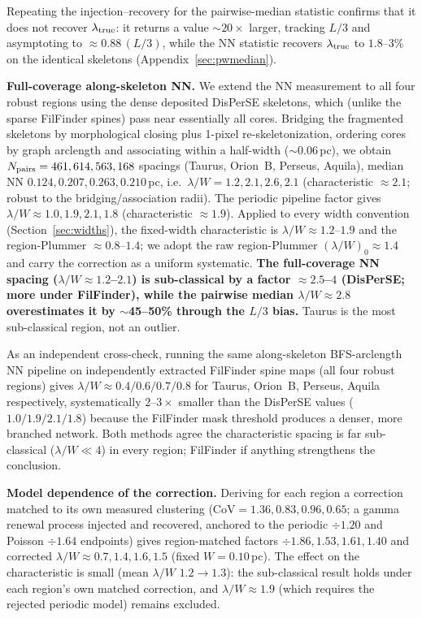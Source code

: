 \documentclass[usenatbib,twoside,twocolumn]{mnras}
\begin{document}
Repeating the injection--recovery for the pairwise-median statistic confirms that it does not recover $\lambda_{\rm true}$: it returns a value $\sim$$20\times$ larger, tracking $L/3$ and asymptoting to $\approx0.88\,(L/3)$, while the NN statistic recovers $\lambda_{\rm true}$ to $1.8$--$3\%$ on the identical skeletons (Appendix~\ref{sec:pwmedian}).

\textbf{Full-coverage along-skeleton NN.} We extend the NN measurement to all four robust regions using the dense deposited DisPerSE skeletons, which (unlike the sparse FilFinder spines) pass near essentially all cores. Bridging the fragmented skeletons by morphological closing plus 1-pixel re-skeletonization, ordering cores by graph arclength and associating within a half-width ($\sim$0.06\,pc), we obtain $N_{\rm pairs}=461,614,563,168$ spacings (Taurus, Orion~B, Perseus, Aquila), median NN $0.124,0.207,0.263,0.210$\,pc, i.e.\ $\lambda/W=1.2,2.1,2.6,2.1$ (characteristic $\approx2.1$; robust to the bridging/association radii). The periodic pipeline factor gives $\lambda/W\approx1.0,1.9,2.1,1.8$ (characteristic $\approx1.9$). Applied to every width convention (Section~\ref{sec:widths}), the fixed-width characteristic is $\lambda/W\approx1.2$--$1.9$ and the region-Plummer $\approx0.8$--$1.4$; we adopt the raw region-Plummer $(\lambda/W)_0\approx1.4$ and carry the correction as a uniform systematic. \textbf{The full-coverage NN spacing ($\lambda/W\approx1.2$--$2.1$) is sub-classical by a factor $\approx2.5$--$4$ (DisPerSE; more under FilFinder), while the pairwise median $\lambda/W\approx2.8$ overestimates it by $\sim$45--50\% through the $L/3$ bias.} Taurus is the most sub-classical region, not an outlier.

As an independent cross-check, running the same along-skeleton BFS-arclength NN pipeline on independently extracted FilFinder spine maps (all four robust regions) gives $\lambda/W\approx0.4/0.6/0.7/0.8$ for Taurus, Orion~B, Perseus, Aquila respectively, systematically $2$--$3\times$ smaller than the DisPerSE values ($1.0/1.9/2.1/1.8$) because the FilFinder mask threshold produces a denser, more branched network. Both methods agree the characteristic spacing is far sub-classical ($\lambda/W\ll4$) in every region; FilFinder if anything strengthens the conclusion.

\smallskip\noindent\textbf{Model dependence of the correction.}\label{sec:injection_recovery_model}
Deriving for each region a correction matched to its own measured clustering (CoV$=1.36,0.83,0.96,0.65$; a gamma renewal process injected and recovered, anchored to the periodic $\div1.20$ and Poisson $\div1.64$ endpoints) gives region-matched factors $\div1.86,1.53,1.61,1.40$ and corrected $\lambda/W\approx0.7,1.4,1.6,1.5$ (fixed $W=0.10$\,pc). The effect on the characteristic is small (mean $\lambda/W$ $1.2\to1.3$): the sub-classical result holds under each region's own matched correction, and $\lambda/W\approx1.9$ (which requires the rejected periodic model) remains excluded.
\end{document}
